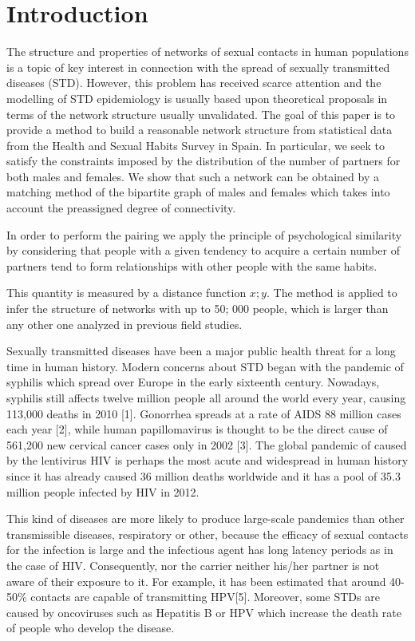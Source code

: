 
\chapter{Introduction}\label{CAPINTRO}

The structure and properties of networks of sexual contacts in human populations is a topic of key interest in connection with the spread of sexually transmitted diseases (STD). However, this problem has received scarce attention and the modelling of STD epidemiology is usually based upon theoretical
proposals in terms of the network structure usually unvalidated. The goal of this paper is to provide a method to build a reasonable network structure from statistical data from the Health and Sexual Habits Survey in Spain.
In particular, we seek to satisfy the constraints imposed by the distribution of the number of partners for both males and females. We show that such a network can be obtained by a matching method of the bipartite graph of males and females which takes into account the preassigned degree of connectivity. 

In order to perform the pairing we apply the principle of psychological similarity by considering that people with a given tendency to acquire a certain number of partners tend to form relationships with other people with the same habits. 

This quantity is measured by a distance function \(x;y\).
The method is applied to infer the structure of networks with up to 50; 000 people, which is larger than any other one analyzed in previous field studies.

Sexually transmitted diseases have been a major public health threat for a long time in human history. Modern concerns about STD began with the pandemic of syphilis which spread over Europe in the early sixteenth century. Nowadays, syphilis still affects twelve million people all around the world every year, causing 113,000 deaths in 2010 [1]. Gonorrhea spreads at a rate of AIDS 88 million cases each year [2], while human papillomavirus is thought to be the direct cause of 561,200 new cervical cancer cases only in 2002 [3]. The global pandemic of caused by the lentivirus HIV is perhaps the most acute and widespread in human history since it has already caused 36 million deaths worldwide and it has a pool of 35.3 million people infected
by HIV in 2012.

This kind of diseases are more likely to produce large-scale pandemics than other transmissible diseases, respiratory or other, because the efficacy of sexual contacts for the infection is large and the infectious agent has long latency periods as in the case of HIV. Consequently, nor the carrier neither his/her partner is not aware of their exposure to it. For example, it has been estimated that around 40-50\% contacts are capable of transmitting HPV[5]. Moreover, some STDs are caused by oncoviruses such as Hepatitis B or HPV which increase the death rate of people who develop the disease.





